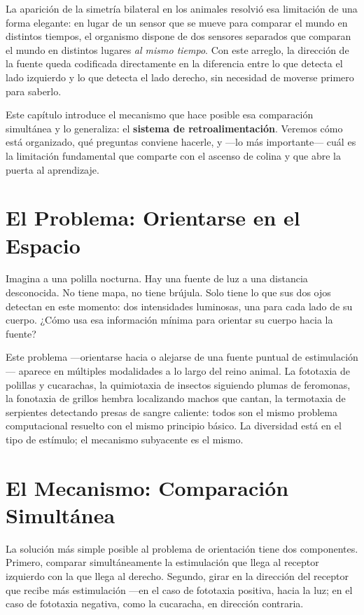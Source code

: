 \documentclass[
  letterpaper,
  DIV=11,
  numbers=noendperiod]{scrreprt}
\begin{document}
La aparición de la simetría bilateral en los animales resolvió esa
limitación de una forma elegante: en lugar de un sensor que se mueve
para comparar el mundo en distintos tiempos, el organismo dispone de dos
sensores separados que comparan el mundo en distintos lugares \emph{al
mismo tiempo}. Con este arreglo, la dirección de la fuente queda
codificada directamente en la diferencia entre lo que detecta el lado
izquierdo y lo que detecta el lado derecho, sin necesidad de moverse
primero para saberlo.

Este capítulo introduce el mecanismo que hace posible esa comparación
simultánea y lo generaliza: el \textbf{sistema de retroalimentación}.
Veremos cómo está organizado, qué preguntas conviene hacerle, y ---lo
más importante--- cuál es la limitación fundamental que comparte con el
ascenso de colina y que abre la puerta al aprendizaje.

\section{El Problema: Orientarse en el
Espacio}\label{el-problema-orientarse-en-el-espacio}

Imagina a una polilla nocturna. Hay una fuente de luz a una distancia
desconocida. No tiene mapa, no tiene brújula. Solo tiene lo que sus dos
ojos detectan en este momento: dos intensidades luminosas, una para cada
lado de su cuerpo. ¿Cómo usa esa información mínima para orientar su
cuerpo hacia la fuente?

Este problema ---orientarse hacia o alejarse de una fuente puntual de
estimulación--- aparece en múltiples modalidades a lo largo del reino
animal. La fototaxia de polillas y cucarachas, la quimiotaxia de
insectos siguiendo plumas de feromonas, la fonotaxia de grillos hembra
localizando machos que cantan, la termotaxia de serpientes detectando
presas de sangre caliente: todos son el mismo problema computacional
resuelto con el mismo principio básico. La diversidad está en el tipo de
estímulo; el mecanismo subyacente es el mismo.

\section{El Mecanismo: Comparación
Simultánea}\label{el-mecanismo-comparaciuxf3n-simultuxe1nea}

La solución más simple posible al problema de orientación tiene dos
componentes. Primero, comparar simultáneamente la estimulación que llega
al receptor izquierdo con la que llega al derecho. Segundo, girar en la
dirección del receptor que recibe más estimulación ---en el caso de
fototaxia positiva, hacia la luz; en el caso de fototaxia negativa, como
la cucaracha, en dirección contraria.
\end{document}
